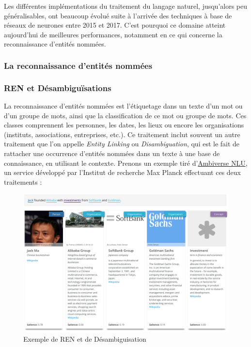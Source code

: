 Les différentes implémentations du traitement du langage naturel, jusqu'alors peu généralisables, ont beaucoup évolué suite à l'arrivée des techniques à base de réseaux de neurones entre 2015 et 2017. C'est pourquoi ce domaine atteint aujourd'hui de meilleures performances, notamment en ce qui concerne la reconnaissance d'entités nommées.
\label{section 2.1.1}

\subsubsection{La reconnaissance d'entités nommées}

\subsubsection*{REN et Désambiguïsations}
La reconnaissance d'entités nommées est l'étiquetage dans un texte d'un mot ou d'un groupe de mots, ainsi que la classification de ce mot ou groupe de mots. Ces classes comprennent les personnes, les dates, les lieux ou encore les organisations (instituts, associations, entreprises, etc.). Ce traitement inclut souvent un autre traitement que l'on appelle \textit{Entity Linking} ou \textit{Disambiguation}, qui est le fait de rattacher une occurrence d'entités nommées dans un texte à une base de connaissance, en utilisant le contexte. Prenons un exemple tiré d'\href{https://ambiversenlu.mpi-inf.mpg.de/}{Ambiverse NLU}, un service développé par l'Institut de recherche Max Planck effectuant ces deux traitements :
\newline

\begin{figure}[H]
    \centering
    \includegraphics[scale=0.24]{images/ner-demo.png}
    \caption{Exemple de REN et de Désambiguisation}
    \label{fig:ner-demo}
\end{figure}

